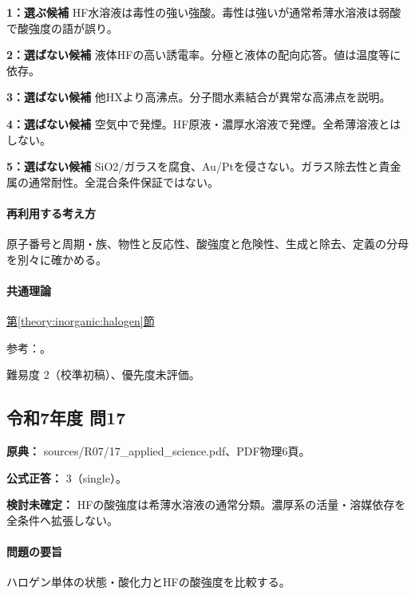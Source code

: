 \noindent\textbf{1：選ぶ候補} HF水溶液は毒性の強い強酸。毒性は強いが通常希薄水溶液は弱酸で酸強度の語が誤り。\par

\noindent\textbf{2：選ばない候補} 液体HFの高い誘電率。分極と液体の配向応答。値は温度等に依存。\par

\noindent\textbf{3：選ばない候補} 他HXより高沸点。分子間水素結合が異常な高沸点を説明。\par

\noindent\textbf{4：選ばない候補} 空気中で発煙。HF原液・濃厚水溶液で発煙。全希薄溶液とはしない。\par

\noindent\textbf{5：選ばない候補} SiO2/ガラスを腐食、Au/Ptを侵さない。ガラス除去性と貴金属の通常耐性。全混合条件保証ではない。\par

\paragraph{再利用する考え方} 原子番号と周期・族、物性と反応性、酸強度と危険性、生成と除去、定義の分母を別々に確かめる。

\paragraph{共通理論} \hyperref[theory:inorganic:halogen]{第\ref*{theory:inorganic:halogen}節}

\par 参考：\cite{niosh_hf,yale_hydrohalic}。

\par 難易度 2（校準初稿）、優先度未評価。

\subsection{令和7年度 問17}
\label{q:r07-reg-applied-17}

\noindent\textbf{原典：} sources/R07/17\_applied\_science.pdf、PDF物理6頁。

\textbf{公式正答：} 3（single）。

\par\textbf{検討未確定：} HFの酸強度は希薄水溶液の通常分類。濃厚系の活量・溶媒依存を全条件へ拡張しない。

\paragraph{問題の要旨} ハロゲン単体の状態・酸化力とHFの酸強度を比較する。

